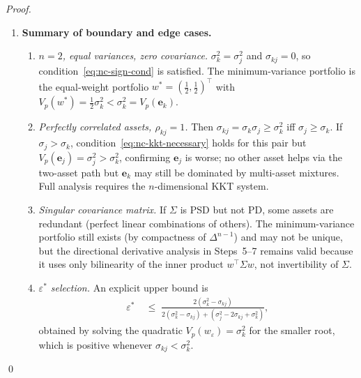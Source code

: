 \documentclass[12pt,openany]{book}
\newcommand{\bfw}{\mathbf{w}}
\newcommand{\bfe}{\mathbf{e}}
\numberwithin{equation}{chapter}
\theoremstyle{plain}
\theoremstyle{definition}
\theoremstyle{remark}
\def\bfw{w}%
\begin{document}
\begin{proof}
\begin{enumerate}
  \item \textbf{Summary of boundary and edge cases.}
        \begin{enumerate}
          \item \emph{$n = 2$, equal variances, zero covariance.}
                $\sigma_k^2 = \sigma_j^2$ and $\sigma_{kj} = 0$,
                so condition~\eqref{eq:nc-sign-cond} is satisfied.
                The minimum-variance portfolio is the equal-weight
                portfolio $\bfw^* = (\tfrac{1}{2}, \tfrac{1}{2})^\top$
                with $V_p(\bfw^*) = \tfrac{1}{2}\sigma_k^2
                < \sigma_k^2 = V_p(\bfe_k)$.
          \item \emph{Perfectly correlated assets, $\rho_{kj}=1$.}
                Then $\sigma_{kj} = \sigma_k\sigma_j \geq \sigma_k^2$
                iff $\sigma_j \geq \sigma_k$.  If $\sigma_j > \sigma_k$,
                condition~\eqref{eq:nc-kkt-necessary} holds for this
                pair but $V_p(\bfe_j) = \sigma_j^2 > \sigma_k^2$,
                confirming $\bfe_j$ is worse; no other asset helps via
                the two-asset path but $\bfe_k$ may still be dominated
                by multi-asset mixtures.  Full analysis requires the
                $n$-dimensional KKT system.
          \item \emph{Singular covariance matrix.}
                If $\Sigma$ is PSD but not PD, some assets are
                redundant (perfect linear combinations of others).
                The minimum-variance portfolio still exists
                (by compactness of $\Delta^{n-1}$) and may not be
                unique, but the directional derivative
                analysis in Steps~5--7 remains valid because it
                uses only bilinearity of the inner product
                $\bfw^\top\Sigma\bfw$, not invertibility of $\Sigma$.
          \item \emph{$\varepsilon^*$ selection.}
                An explicit upper bound is
                \begin{align}
                  \varepsilon^*
                  &\;\leq\; \frac{2(\sigma_k^2 - \sigma_{kj})}
                               {2(\sigma_k^2 - \sigma_{kj})
                                + (\sigma_j^2 - 2\sigma_{kj}
                                   + \sigma_k^2)},
                  \label{eq:nc-eps-bound}
                \end{align}
                obtained by solving the quadratic
                $V_p(\bfw_\varepsilon) = \sigma_k^2$ for the
                smaller root, which is positive whenever
                $\sigma_{kj} < \sigma_k^2$.
        \end{enumerate}

\end{enumerate}
\qed
\end{proof}
\end{document}

